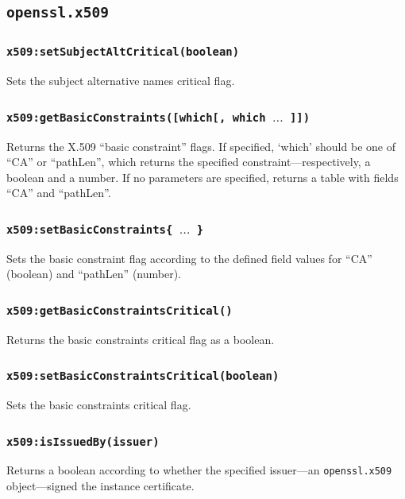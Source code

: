 \documentclass[11pt, oneside]{memoir}
\newcommand*{\fn}[1]{\texttt{#1}\xspace}
\newcommand*{\module}[1]{\texttt{#1}\xspace}
\newcounter{toccols}
\newenvironment{Module}[1]{
	\subsection{\texttt{#1}}
	\addtocontents{toc}{
		\protect\begin{multicols}{\value{toccols}}
	}
}{
	\addtocontents{toc}{\protect\end{multicols}}
}
\begin{document}
\begin{Module}{openssl.x509}
\subsubsection[\fn{x509:setSubjectAltCritical}]{\fn{x509:setSubjectAltCritical(boolean)}}

Sets the subject alternative names critical flag.

\subsubsection[\fn{x509:getBasicConstraints}]{\fn{x509:getBasicConstraints([which[, which $\ldots$ ]])}}

Returns the X.509 ``basic constraint'' flags. If specified, `which' should be one of ``CA'' or ``pathLen'', which returns the specified constraint---respectively, a boolean and a number.  If no parameters are specified, returns a table with fields ``CA'' and ``pathLen''.

\subsubsection[\fn{x509:setBasicConstraints}]{\fn{x509:setBasicConstraints\{ $\ldots$ \}}}

Sets the basic constraint flag according to the defined field values for ``CA'' (boolean) and ``pathLen'' (number).

\subsubsection[\fn{x509:getBasicConstraintsCritical}]{\fn{x509:getBasicConstraintsCritical()}}

Returns the basic constraints critical flag as a boolean.

\subsubsection[\fn{x509:setBasicConstraintsCritical}]{\fn{x509:setBasicConstraintsCritical(boolean)}}

Sets the basic constraints critical flag.

\subsubsection[\fn{x509:isIssuedBy}]{\fn{x509:isIssuedBy(issuer)}}

Returns a boolean according to whether the specified issuer---an \module{openssl.x509} object---signed the instance certificate.


\end{Module}
\end{document}
